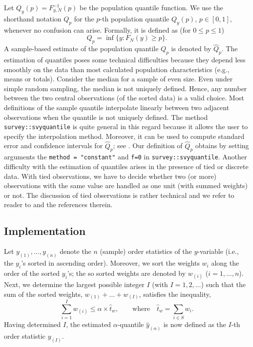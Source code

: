 \documentclass[a4paper,11pt]{scrreprt}
\begin{document}
Let $Q_y(p) = F_{y,N}^{-1}(p)$ be the population quantile function. We use the shorthand notation $Q_p$ for the $p$-th population quantile $Q_y(p)$, $p \in [0,1]$, whenever no confusion can arise. Formally, it is defined as (for $0 \leq p \leq 1$)
\begin{equation*}
   Q_p = \inf \{ y : F_N(y) \geq p \}.
\end{equation*}
\noindent A sample-based estimate of the population quantile $Q_p$ is denoted by $\widehat{Q}_p$. The estimation of quantiles poses some technical difficulties because they depend less smoothly on the data than most calculated population characteristics (e.g., means or totals). Consider the median for a sample of even size. Even under simple random sampling, the median is not uniquely defined. Hence, any number between the two central observations (of the sorted data) is a valid choice. Most definitions of the sample quantile interpolate linearly between two adjacent observations when the quantile is not uniquely defined. The method \texttt{survey::svyquantile} is quite general in this regard because it allows the user to specify the interpolation method. Moreover, it can be used to compute standard error and confidence intervals for $\widehat{Q}_p$; see \citet[][ch. 2.4.1]{lumley2010}. Our definition of $\widehat{Q}_p$ obtains by setting arguments the \texttt{method = "constant"} and \texttt{f=0} in \texttt{survey::svyquantile}. Another difficulty with the estimation of quantiles arises in the presence of tied or discrete data. With tied observations, we have to decide whether two (or more) observations with the same value are handled as one unit (with summed weights) or not. The discussion of tied observations is rather technical and we refer to reader to \citet[][ch. 2.4.1]{lumley2010} and the references therein.

\subsection{Implementation}
Let $y_{(1)}, \ldots, y_{(n)}$ denote the $n$ (sample) order statistics of the $y$-variable (i.e., the $y_i$'s sorted in ascending order). Moreover, we sort the weights $w_i$ along the order of the sorted $y_i$'s; the so sorted weights are denoted by $w_{(i)}$ ($i=1,\ldots,n$). Next, we determine the largest possible integer $I$ (with $I=1,2,\ldots$) such that the sum of the sorted weights, $w_{(1)} + \ldots + w_{(I)}$, satisfies the inequality, 
\begin{equation*}
   \sum_{i=1}^{I} w_{(i)} \leq \alpha \times \hat{t}_w, \qquad \text{where} \quad \hat{t}_w = \sum_{i \in S} w_i. 
\end{equation*}
\noindent Having determined $I$, the estimated $\alpha$-quantile $\hat{y}_{(\alpha)}$ is now defined as the $I$-th order statistic $y_{(I)}$.
\end{document}
